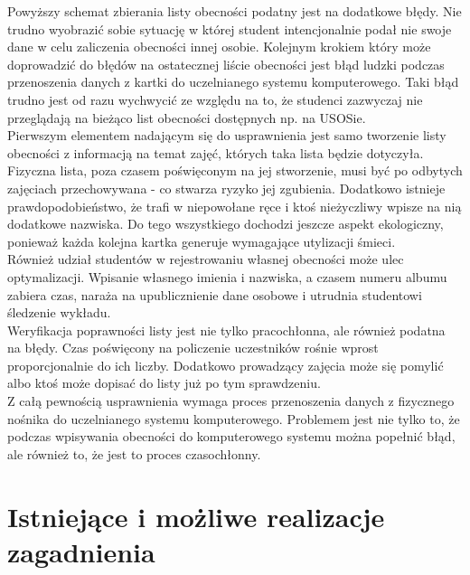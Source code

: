 \documentclass[declaration,shortabstract, mgr]{iithesis}
\begin{document}
\indent Powyższy schemat zbierania listy obecności podatny jest na dodatkowe błędy. Nie trudno wyobrazić sobie sytuację w której student intencjonalnie podał nie swoje dane w celu zaliczenia obecności innej osobie. Kolejnym krokiem który może doprowadzić do błędów na ostatecznej liście obecności jest błąd ludzki podczas przenoszenia danych z kartki do uczelnianego systemu komputerowego. Taki błąd trudno jest od razu wychwycić ze względu na to, że studenci zazwyczaj nie przeglądają na bieżąco list obecności dostępnych np. na USOSie.\\
\indent Pierwszym elementem nadającym się do usprawnienia jest samo tworzenie listy obecności z informacją na temat zajęć, których taka lista będzie dotyczyła. Fizyczna lista, poza czasem poświęconym na jej stworzenie, musi być po odbytych zajęciach przechowywana - co stwarza ryzyko jej zgubienia. Dodatkowo istnieje prawdopodobieństwo, że trafi w niepowołane ręce i ktoś nieżyczliwy wpisze na nią dodatkowe nazwiska. Do tego wszystkiego dochodzi jeszcze aspekt ekologiczny, ponieważ każda kolejna kartka generuje wymagające utylizacji śmieci. \\
\indent Również udział studentów w rejestrowaniu własnej obecności może ulec optymalizacji. Wpisanie własnego imienia i nazwiska, a czasem numeru albumu zabiera czas, naraża na upublicznienie dane osobowe i utrudnia studentowi śledzenie wykładu.\\
\indent Weryfikacja poprawności listy jest nie tylko pracochłonna, ale również podatna na błędy. Czas poświęcony na policzenie uczestników rośnie wprost proporcjonalnie do ich liczby. Dodatkowo prowadzący zajęcia może się pomylić albo ktoś może dopisać do listy już po tym sprawdzeniu.\\
\indent Z całą pewnością usprawnienia wymaga proces przenoszenia danych z fizycznego nośnika do uczelnianego systemu komputerowego. Problemem jest nie tylko to, że podczas wpisywania obecności do komputerowego systemu można popełnić błąd, ale również to, że jest to proces czasochłonny.\\

\section{Istniejące i możliwe realizacje zagadnienia}
\end{document}
